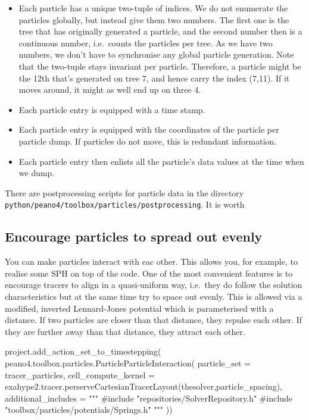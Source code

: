 \begin{itemize}
  \item Each particle has a unique two-tuple of indices. We do not enumerate the
  particles globally, but instead give them two numbers. The first one is the
  tree that has originally generated a particle, and the second number then is a
  continuous number, i.e.~counts the particles per tree. As we have two numbers,
  we don't have to synchronise any global particle generation. Note that the
  two-tuple stays invariant per particle. Therefore, a particle might be the
  12th that's generated on tree 7, and hence carry the index (7,11). If it moves
  around, it might as well end up on three 4.
  \item Each particle entry is equipped with a time stamp.
  \item Each particle entry is equipped with the coordinates of the particle per
  particle dump. If particles do not move, this is redundant information.
  \item Each particle entry then enlists all the particle's data values at the
  time when we dump.
\end{itemize}


\begin{remark}
 There are postprocessing scripts for particle data in the directory
 \texttt{python/peano4/toolbox/particles/postprocessing}. It is worth 
\end{remark}

\subsection{Encourage particles to spread out evenly}

You can make particles interact with eac other. 
This allows you, for example, to
realise some SPH on top of the code.
One of the most convenient features is to encourage tracers to align in a
quasi-uniform way, i.e.~they do follow the solution characteristics but at the
same time try to space out evenly.
This is allowed via a modified, inverted Lennard-Jones potential
which is parameterised with a distance.
If two particles are closer than that distance, they repulse each other. 
If they are further away than that distance, they attract each other.

\begin{code}
project.add_action_set_to_timestepping( peano4.toolbox.particles.ParticleParticleInteraction(
  particle_set = tracer_particles,
  cell_compute_kernel = exahype2.tracer.perserveCartesianTracerLayout(thesolver,particle_spacing),
  additional_includes = """
#include "repositories/SolverRepository.h"
#include "toolbox/particles/potentials/Springs.h"
"""
))
\end{code}

